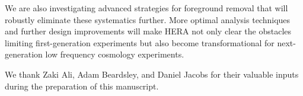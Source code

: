 \documentclass[preprint2,iop,numberedappendix,twocolappendix,appendixfloats]{emulateapj}
\begin{document}
We are also investigating advanced strategies for foreground removal that will robustly eliminate these systematics further. More optimal analysis techniques and further design improvements will make HERA not only clear the obstacles limiting first-generation experiments but also become transformational for next-generation low frequency cosmology experiments.

\acknowledgments

We thank Zaki Ali, Adam Beardsley, and Daniel Jacobs for their valuable inputs during the preparation of this manuscript.




\end{document}
